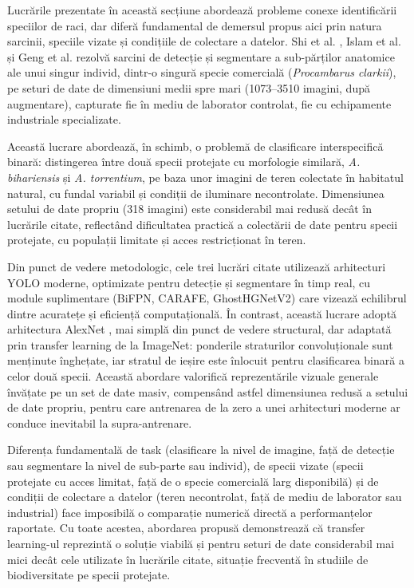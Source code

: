 Lucrările prezentate în această secțiune abordează probleme conexe identificării speciilor de raci, dar diferă fundamental de demersul propus aici prin natura sarcinii, speciile vizate și condițiile de colectare a datelor. Shi et al. \cite{Lightweight_detection_and_segmentation_of_crayfish_parts_using_an_improved_YOLOv11n_segmentation_model}, Islam et al. \cite{Identification_Algorithm_of_Crayfish_Body_Features_Based_on_the_Improved_YOLOv8n_Loss_Function} și Geng et al. \cite{Application_of_Improved_YOLOv8n-seg_in_Crayfish_Trunk_Segmentation} rezolvă sarcini de detecție și segmentare a sub-părților anatomice ale unui singur individ, dintr-o singură specie comercială (\textit{Procambarus clarkii}), pe seturi de date de dimensiuni medii spre mari (1073--3510 imagini, după augmentare), capturate fie în mediu de laborator controlat, fie cu echipamente industriale specializate.

Această lucrare abordează, în schimb, o problemă de clasificare interspecifică binară: distingerea între două specii protejate cu morfologie similară, \textit{A. bihariensis} și \textit{A. torrentium}, pe baza unor imagini de teren colectate în habitatul natural, cu fundal variabil și condiții de iluminare necontrolate. Dimensiunea setului de date propriu (318 imagini) este considerabil mai redusă decât în lucrările citate, reflectând dificultatea practică a colectării de date pentru specii protejate, cu populații limitate și acces restricționat în teren.

Din punct de vedere metodologic, cele trei lucrări citate utilizează arhitecturi YOLO moderne, optimizate pentru detecție și segmentare în timp real, cu module suplimentare (BiFPN, CARAFE, GhostHGNetV2) care vizează echilibrul dintre acuratețe și eficiență computațională. În contrast, această lucrare adoptă arhitectura AlexNet \cite{krizhevsky2012imagenet}, mai simplă din punct de vedere structural, dar adaptată prin transfer learning de la ImageNet: ponderile straturilor convoluționale sunt menținute înghețate, iar stratul de ieșire este înlocuit pentru clasificarea binară a celor două specii. Această abordare valorifică reprezentările vizuale generale învățate pe un set de date masiv, compensând astfel dimensiunea redusă a setului de date propriu, pentru care antrenarea de la zero a unei arhitecturi moderne ar conduce inevitabil la supra-antrenare.

Diferența fundamentală de task (clasificare la nivel de imagine, față de detecție sau segmentare la nivel de sub-parte sau individ), de specii vizate (specii protejate cu acces limitat, față de o specie comercială larg disponibilă) și de condiții de colectare a datelor (teren necontrolat, față de mediu de laborator sau industrial) face imposibilă o comparație numerică directă a performanțelor raportate. Cu toate acestea, abordarea propusă demonstrează că transfer learning-ul reprezintă o soluție viabilă și pentru seturi de date considerabil mai mici decât cele utilizate în lucrările citate, situație frecventă în studiile de biodiversitate pe specii protejate.




